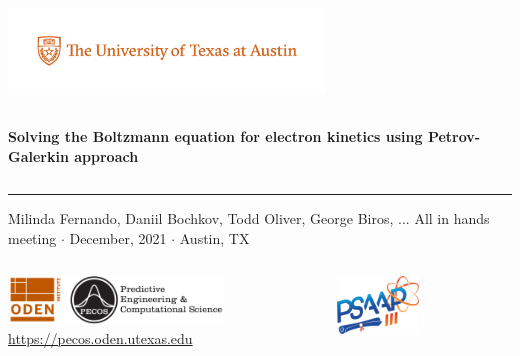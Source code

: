 \documentclass[mathserif, aspectratio=169]{beamer}
\begin{document}

	\begin{frame}[plain,t]{}
	\makeatletter
	\includegraphics[height=0.9in,trim=50 40 40 0, clip]{PMSc_159_university_formal_horizontal.pdf} \newline
	\begin{columns}[T,onlytextwidth]
	{\bf \color{burntorange} \selectfont 
		Solving the Boltzmann equation for electron kinetics using Petrov-Galerkin approach
	}
	\end{columns}
	\vspace*{.15cm}
	\rule{.8\textwidth}{0.6pt} \newline
	
	\vspace*{0.05cm}
	{\selectfont
	 { \scriptsize
	   Milinda Fernando, Daniil Bochkov, Todd Oliver, George Biros, ...\newline
	 }
	 {\color{burntorange} \tiny
	   All in hands meeting $\cdot$ December, 2021 $\cdot$ Austin, TX
	 }
	}
	
	\vspace*{1cm}
	\begin{columns}
	\begin{column}{0.8\linewidth}
	\includegraphics[height=0.5in]{oden_pecos_2020_wordmark.png}\\
	{\scriptsize \url{https://pecos.oden.utexas.edu}}
	\end{column}
	
	\begin{column}{0.2\linewidth}
	\includegraphics[height=0.6in]{psaap3-logo.png}
	\end{column}
	\end{columns}
	
	\end{frame}
\end{document}
